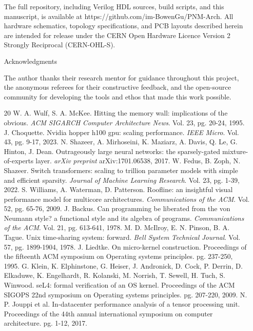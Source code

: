 \documentclass[10pt,twocolumn]{article}
\begin{document}
The full repository, including Verilog HDL sources, build scripts, and this manuscript, is available at https://github.com/im-BowenGu/PNM-Arch. All hardware schematics, topology specifications, and PCB layouts described herein are intended for release under the CERN Open Hardware Licence Version 2 Strongly Reciprocal (CERN-OHL-S)\cite{20}.

Acknowledgments

The author thanks their research mentor for guidance throughout this project, the anonymous referees for their constructive feedback, and the open-source community for developing the tools and ethos that made this work possible.


\begin{thebibliography}{20}
 W. A. Wulf, S. A. McKee. Hitting the memory wall: implications of the obvious. \textit{ACM SIGARCH Computer Architecture News}. Vol. 23, pg. 20-24, 1995.
 J. Choquette. Nvidia hopper h100 gpu: scaling performance. \textit{IEEE Micro}. Vol. 43, pg. 9-17, 2023.
 N. Shazeer, A. Mirhoseini, K. Maziarz, A. Davis, Q. Le, G. Hinton, J. Dean. Outrageously large neural networks: the sparsely-gated mixture-of-experts layer. \textit{arXiv preprint} arXiv:1701.06538, 2017.
 W. Fedus, B. Zoph, N. Shazeer. Switch transformers: scaling to trillion parameter models with simple and efficient sparsity. \textit{Journal of Machine Learning Research}. Vol. 23, pg. 1-39, 2022.
 S. Williams, A. Waterman, D. Patterson. Roofline: an insightful visual performance model for multicore architectures. \textit{Communications of the ACM}. Vol. 52, pg. 65-76, 2009.
 J. Backus. Can programming be liberated from the von Neumann style? a functional style and its algebra of programs. \textit{Communications of the ACM}. Vol. 21, pg. 613-641, 1978.
 M. D. McIlroy, E. N. Pinson, B. A. Tague. Unix time-sharing system: forward. \textit{Bell System Technical Journal}. Vol. 57, pg. 1899-1904, 1978.
 J. Liedtke. On micro-kernel construction. Proceedings of the fifteenth ACM symposium on Operating systems principles. pg. 237-250, 1995.
 G. Klein, K. Elphinstone, G. Heiser, J. Andronick, D. Cock, P. Derrin, D. Elkaduwe, K. Engelhardt, R. Kolanski, M. Norrish, T. Sewell, H. Tuch, S. Winwood. seL4: formal verification of an OS kernel. Proceedings of the ACM SIGOPS 22nd symposium on Operating systems principles. pg. 207-220, 2009.
 N. P. Jouppi et al. In-datacenter performance analysis of a tensor processing unit. Proceedings of the 44th annual international symposium on computer architecture. pg. 1-12, 2017.

\end{thebibliography}
\end{document}
